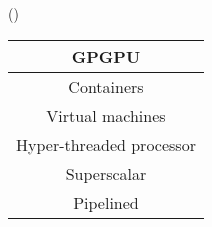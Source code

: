 \begin{theorem}{()}
\begin{itemize}
\begin{table}[H]
            \centering
            \begin{tabular}{|c|}
                \hline
                GPGPU \\
                \hline
                Containers \\
                \hline
                Virtual machines \\
                \hline
                Hyper-threaded processor \\
                \hline
                Superscalar \\
                \hline
                Pipelined \\
                \hline
            \end{tabular}
        \end{table}
    \end{itemize}
\end{theorem}
